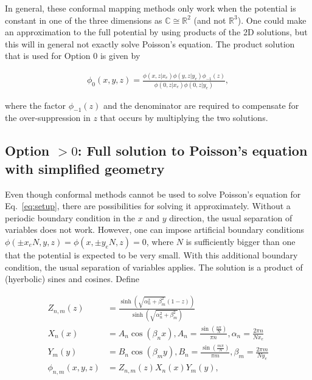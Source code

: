 \documentclass[12pt]{article}
\begin{document}
\vspace{3mm}

In general, these conformal mapping methods only work when the potential is constant in one of the three dimensions as $\mathbb{C}\cong\mathbb{R}^2$ (and not $\mathbb{R}^3$).  One could make an approximation to the full potential by using products of the 2D solutions, but this will in general not exactly solve Poisson's equation.  The product solution that is used for Option 0 is given by

\begin{align}
\phi_{0}(x,y,z) = \frac{\phi(x,z|x_e)\phi(y,z|y_e)\phi_{-1}(z)}{\phi(0,z|x_e)\phi(0,z|y_e)},
\end{align} 

\noindent where the factor $\phi_{-1}(z)$ and the denominator are required to compensate for the over-suppression in $z$ that occurs by multiplying the two solutions.  

\clearpage
\newpage

\subsection{Option $>0$: Full solution to Poisson's equation with simplified geometry}

Even though conformal methods cannot be used to solve Poisson's equation for Eq.~\ref{eq:setup}, there are possibilities for solving it approximately.  Without a periodic boundary condition in the $x$ and $y$ direction, the usual separation of variables does not work.  However, one can impose artificial boundary conditions $\phi(\pm x_eN,y,z)=\phi(x,\pm y_eN,z)=0$, where $N$ is sufficiently bigger than one that the potential is expected to be very small.  With this additional boundary condition, the usual separation of variables applies.  The solution is a product of (hyerbolic) sines and cosines. Define

\begin{align}
Z_{n,m}(z)&=\frac{\sinh\left(\sqrt{\alpha_n^2+\beta_m^2}\left(1-z\right)\right)}{\sinh\left(\sqrt{\alpha_n^2+\beta_m^2}\right)}\\
X_{n}(x)&=A_n\cos(\beta_n x), A_n=\frac{\sin\left(\frac{n\pi}{N}\right)}{\pi n},\alpha_n=\frac{2\pi n}{Nx_e}\\
Y_{m}(y)&=B_n\cos(\beta_m y), B_n=\frac{\sin\left(\frac{m\pi}{N}\right)}{\pi m},\beta_m=\frac{2\pi m}{Ny_e}\\
\phi_{n,m}(x,y,z)&=Z_{n,m}(z)X_n(x)Y_m(y),
\end{align}
\end{document}
